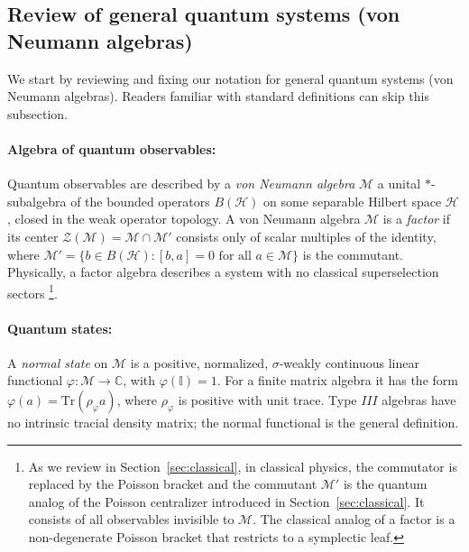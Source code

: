 \documentclass[a4paper,11pt]{article}
\theoremstyle{definition}
\newcommand{\id}{\mathbb{I}}
\newcommand{\Tr}{\text{Tr}}
\begin{document}
\subsection{Review of general quantum systems (von Neumann algebras)}\label{app:vN}


We start by reviewing and fixing our notation for general quantum systems (von Neumann algebras). Readers familiar with standard definitions can skip this subsection.

\paragraph{Algebra of quantum observables:}
Quantum observables are described by a
\emph{von Neumann algebra} $\mathcal M$ a unital $*$-subalgebra of the bounded operators
$B(\mathcal{H})$ on some separable Hilbert space $\mathcal{H}$, closed in the
weak operator topology.
A von Neumann algebra $\mathcal M$ is a \emph{factor} if its center
$\mathcal{Z}(\mathcal M) = \mathcal M\cap\mathcal M'$ consists only of scalar multiples
of the identity, where $\mathcal M' = \{b\in B(\mathcal{H}) : [b,a]=0\text{ for all }a\in\mathcal M\}$
is the commutant.  Physically, a factor algebra describes a system with no classical
superselection sectors \footnote{As we review in Section~\ref{sec:classical}, in classical physics, the commutator is replaced by the Poisson bracket and the commutant $\mathcal M'$ is the quantum analog of the Poisson
centralizer introduced in Section~\ref{sec:classical}. It consists of all observables invisible to $\mathcal M$. The classical analog of a factor is a non-degenerate Poisson bracket that restricts to a symplectic leaf.}.

\paragraph{Quantum states:}

A \emph{normal state} on $\mathcal M$ is a positive, normalized, $\sigma$-weakly continuous
linear functional $\varphi:\mathcal M\to\mathbb{C}$, with $\varphi(\id)=1$.
For a finite matrix algebra it has the form $\varphi(a)=\Tr(\rho_\varphi a)$,
where $\rho_\varphi$ is positive with unit trace. Type $III$ algebras have no
intrinsic tracial density matrix; the normal functional is the general definition.
\end{document}
